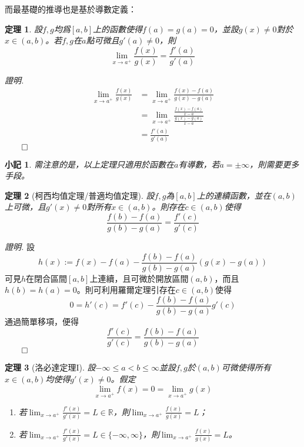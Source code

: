 \documentclass[12pt]{article}
\newtheorem*{theorem}{定理}
\newtheorem*{remark}{小記}
\renewenvironment*{proof}{\textit{證明.}}{\hfill$\qed$}
\begin{document}
    而最基礎的推導也是基於導數定義：

    \begin{theorem}
        設$f,g$均爲$[a,b]$上的函數使得$f(a)=g(a)=0$，並設$g(x)\neq 0$對於$x\in(a,b)$。若$f,g$在$a$點可微且$g'(a)\neq 0$，則$$\lim_{x\to a^+}\frac{f(x)}{g(x)}=\frac{f'(a)}{g'(a)}$$
    \end{theorem}

    \begin{proof}
        \begin{align*}
            \lim_{x\to a^+}\frac{f(x)}{g(x)}&=\lim_{x\to a^+}\frac{f(x)-f(a)}{g(x)-g(a)}\\
            &=\lim_{x\to a^+}\frac{\frac{f(x)-f(a)}{x-a}}{\frac{g(x)-g(a)}{x-a}}\\
            &=\frac{f'(a)}{g'(a)}
        \end{align*}
    \end{proof}

    \begin{remark}
        需注意的是，以上定理只適用於函數在$a$有導數，若$a=\pm\infty$，則需要更多手段。
    \end{remark}

    \begin{theorem}[柯西均值定理/普適均值定理]
        設$f,g$為$[a,b]$上的連續函數，並在$(a,b)$上可微，且$g'(x)\neq 0$對所有$x\in(a,b)$。則存在$c\in(a,b)$使得$$\frac{f(b)-f(a)}{g(b)-g(a)}=\frac{f'(c)}{g'(c)}$$
    \end{theorem}

    \begin{proof}
        設$$h(x):=f(x)-f(a)-\frac{f(b)-f(a)}{g(b)-g(a)}(g(x)-g(a))$$可見$h$在閉合區間$[a,b]$上連續，且可微於開放區間$(a,b)$，而且$h(b)=h(a)=0$。則可利用羅爾定理引存在$c\in(a,b)$使得$$0=h'(c)=f'(c)-\frac{f(b)-f(a)}{g(b)-g(a)}g'(c)$$通過簡單移項，便得$$\frac{f'(c)}{g'(c)}=\frac{f(b)-f(a)}{g(b)-g(a)}$$
    \end{proof}

    \begin{theorem}[洛必達定理I]
        設$-\infty\leq a< b\leq \infty$並設$f,g$於$(a,b)$可微使得所有$x\in(a,b)$均使得$g'(x)\neq 0$。假定$$\lim_{x\to a^+}f(x)=0=\lim_{x\to a^+}g(x)$$\begin{enumerate}
            \item 若$\displaystyle\lim_{x\to a^+}\frac{f'(x)}{g'(x)}=L\in\mathbb{R}$，則$\displaystyle\lim_{x\to a^+}\frac{f(x)}{g(x)}=L$；
            \item 若$\displaystyle\lim_{x\to a^+}\frac{f'(x)}{g'(x)}=L\in\{-\infty,\infty\}$，則$\displaystyle\lim_{x\to a^+}\frac{f(x)}{g(x)}=L$。
        \end{enumerate}
    \end{theorem}
\end{document}
